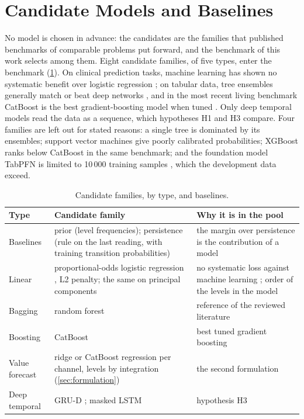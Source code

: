 \documentclass[11pt,a4paper,oneside]{report}
\begin{document}
\section{Candidate Models and Baselines}\label{sec:ml}\label{sec:families}\label{sec:baselines}

No model is chosen in advance: the candidates are the families that published benchmarks of comparable problems put forward, and the benchmark of this work selects among them. Eight candidate families, of five types, enter the benchmark (\cref{tab:candidates}). On clinical prediction tasks, machine learning has shown no systematic benefit over logistic regression \parencite{christodoulou2019}; on tabular data, tree ensembles generally match or beat deep networks \parencite{grinsztajn2022}, and in the most recent living benchmark CatBoost is the best gradient-boosting model when tuned \parencite{erickson2025}. Only deep temporal models read the data as a sequence, which hypotheses H1 and H3 compare. Four families are left out for stated reasons: a single tree is dominated by its ensembles; support vector machines give poorly calibrated probabilities; XGBoost ranks below CatBoost in the same benchmark; and the foundation model TabPFN is limited to 10\,000 training samples \parencite{hollmann2025}, which the development data exceed.

\begin{table}[htbp]
\centering\footnotesize
\caption{Candidate families, by type, and baselines.}\label{tab:candidates}
\begin{tabularx}{\textwidth}{@{}>{\raggedright\arraybackslash}p{2.4cm} >{\raggedright\arraybackslash}p{4.4cm} X@{}}
\toprule
\textbf{Type} & \textbf{Candidate family} & \textbf{Why it is in the pool} \\
\midrule
Baselines & prior (level frequencies); persistence (rule on the last reading, with training transition probabilities) & the margin over persistence is the contribution of a model \\
Linear & proportional-odds logistic regression \parencite{mccullagh1980}, L2 penalty; the same on principal components & no systematic loss against machine learning \parencite{christodoulou2019}; order of the levels in the model \\
Bagging & random forest \parencite{breiman2001} & reference of the reviewed literature \parencite{mendoza2025} \\
Boosting & CatBoost \parencite{prokhorenkova2018} & best tuned gradient boosting \parencite{erickson2025} \\
Value forecast & ridge or CatBoost regression per channel, levels by integration (\cref{sec:formulation}) & the second formulation \\
Deep temporal & GRU-D \parencite{che2018}; masked LSTM \parencite{hochreiter1997} & hypothesis H3 \\
\bottomrule
\end{tabularx}
\end{table}
\end{document}
